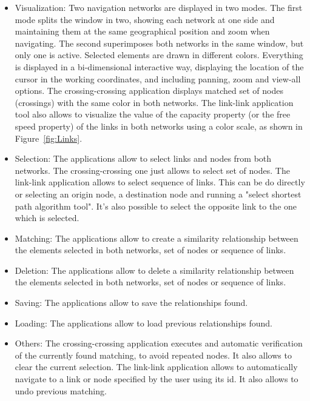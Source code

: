 \begin{itemize}
\item Visualization: Two navigation networks are displayed in two modes. The first mode splits the window in two, showing each network at one side and maintaining them at the same geographical position and zoom when navigating. The second superimposes both networks in the same window, but only one is active. Selected elements are drawn in different colors. Everything is displayed in a bi-dimensional interactive way, displaying the location of the cursor in the working coordinates, and including panning, zoom and view-all options. The crossing-crossing application displays matched set of nodes (crossings) with the same color in both networks. The link-link application tool also allows to visualize the value of the capacity property (or the free speed property) of the links in both networks using a color scale, as shown in Figure~\ref{fig:Links}.
\item Selection: The applications allow to select links and nodes from both networks. The crossing-crossing one just allows to select set of nodes. The link-link application allows to select sequence of links. This can be do directly or selecting an origin node, a destination node and running a "select shortest path algorithm tool". It's also possible to select the opposite link to the one which is selected.
\item Matching: The applications allow to create a similarity relationship between the elements selected in both networks, set of nodes or sequence of links.
\item Deletion: The applications allow to delete a similarity relationship between the elements selected in both networks, set of nodes or sequence of links.
\item Saving: The applications allow to save the relationships found.
\item Loading: The applications allow to load previous relationships found.
\item Others: The crossing-crossing application executes and automatic verification of the currently found matching, to avoid repeated nodes. It also allows to clear the current selection. The link-link application allows to automatically navigate to a link or node specified by the user using its id. It also allows to undo previous matching. 
\end{itemize}

